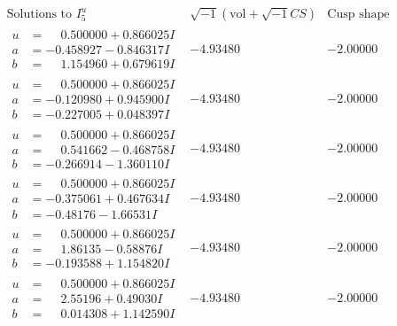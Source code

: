 \documentclass[1p]{elsarticle_modified}
\theoremstyle{definition}
\newcommand{\I}{\sqrt{-1}}
\begin{document}
$$\begin{array}{c|c|c}  
\text{Solutions to }I^u_{5}& \I (\text{vol} + \sqrt{-1}CS) & \text{Cusp shape}\\
 \hline 
\begin{aligned}
u &= \phantom{-}0.500000 + 0.866025 I \\
a &= -0.458927 - 0.846317 I \\
b &= \phantom{-}1.154960 + 0.679619 I\end{aligned}
 & -4.93480\phantom{ +0.000000I} & -2.00000\phantom{ +0.000000I} \\ \hline\begin{aligned}
u &= \phantom{-}0.500000 + 0.866025 I \\
a &= -0.120980 + 0.945900 I \\
b &= -0.227005 + 0.048397 I\end{aligned}
 & -4.93480\phantom{ +0.000000I} & -2.00000\phantom{ +0.000000I} \\ \hline\begin{aligned}
u &= \phantom{-}0.500000 + 0.866025 I \\
a &= \phantom{-}0.541662 - 0.468758 I \\
b &= -0.266914 - 1.360110 I\end{aligned}
 & -4.93480\phantom{ +0.000000I} & -2.00000\phantom{ +0.000000I} \\ \hline\begin{aligned}
u &= \phantom{-}0.500000 + 0.866025 I \\
a &= -0.375061 + 0.467634 I \\
b &= -0.48176 - 1.66531 I\end{aligned}
 & -4.93480\phantom{ +0.000000I} & -2.00000\phantom{ +0.000000I} \\ \hline\begin{aligned}
u &= \phantom{-}0.500000 + 0.866025 I \\
a &= \phantom{-}1.86135 - 0.58876 I \\
b &= -0.193588 + 1.154820 I\end{aligned}
 & -4.93480\phantom{ +0.000000I} & -2.00000\phantom{ +0.000000I} \\ \hline\begin{aligned}
u &= \phantom{-}0.500000 + 0.866025 I \\
a &= \phantom{-}2.55196 + 0.49030 I \\
b &= \phantom{-}0.014308 + 1.142590 I\end{aligned}
 & -4.93480\phantom{ +0.000000I} & -2.00000\phantom{ +0.000000I} \\ \hline\begin{aligned}

\end{aligned}
\end{array}$$
\end{document}
